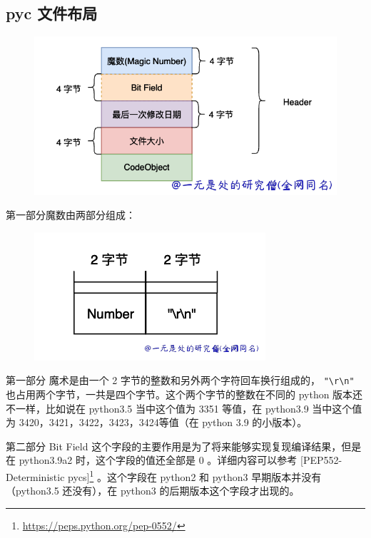 \subsection{pyc 文件布局}

    \begin{figure}[H]
        \centering
            \includegraphics[scale=.35]{images/38-pyc.png}
						\caption{ }
        \label{fig:my_label}
    \end{figure}
    
第一部分魔数由两部分组成：

    \begin{figure}[H]
        \centering
            \includegraphics[scale=.3]{images/37-pyc.png}
						\caption{ }
        \label{fig:my_label}
    \end{figure}
第一部分 魔术是由一个 2 字节的整数和另外两个字符回车换行组成的， \verb|"\r\n"|  也占用两个字节，一共是四个字节。这个两个字节的整数在不同的 python 版本还不一样，比如说在 python3.5 当中这个值为 3351 等值，在 python3.9 当中这个值为 3420，3421，3422，3423，3424等值（在 python 3.9 的小版本）。

第二部分 Bit Field 这个字段的主要作用是为了将来能够实现复现编译结果，但是在 python3.9a2 时，这个字段的值还全部是 0 。详细内容可以参考 [PEP552-Deterministic pycs]\footnote{\href{https://peps.python.org/pep-0552/}{https://peps.python.org/pep-0552/}} 。这个字段在 python2 和 python3 早期版本并没有（python3.5 还没有），在 python3 的后期版本这个字段才出现的。

